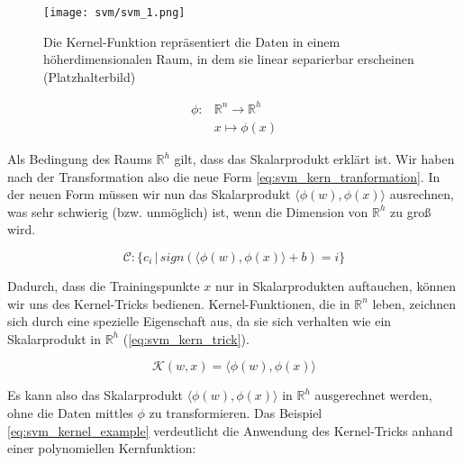 \begin{figure}[htbp] \centering
    \texttt{[image: svm/svm\_1.png]}
    \caption{Die Kernel-Funktion repräsentiert die Daten in einem höherdimensionalen Raum, in dem sie linear separierbar erscheinen (Platzhalterbild)}
    \label{fig:svm_kernel}
\end{figure}

\begin{equation}
\label{eq:svm_kernel_function}
\begin{split}
    \phi : & \mathbb{R}^n \to \mathbb{R}^h \\
    & x \mapsto \phi(x)
\end{split} 
\end{equation}

Als Bedingung des Raums $\mathbb{R}^h$ gilt, dass das Skalarprodukt erklärt ist. 
Wir haben nach der Transformation also die neue Form \ref{eq:svm_kern_tranformation}. 
In der neuen Form müssen wir nun das Skalarprodukt $\langle\phi(w),\phi(x)\rangle$ ausrechnen, was sehr schwierig (bzw. unmöglich) ist, wenn die Dimension von $\mathbb{R}^h$ zu groß wird.

\begin{equation}
\label{eq:svm_kern_tranformation}
    \mathcal{C}: \{ c_i \,|\, sign(\langle \phi(w),\phi(x) \rangle + b) = i \}
\end{equation}

Dadurch, dass die Trainingspunkte $x$ nur in Skalarprodukten auftauchen, können wir uns des Kernel-Tricks bedienen.
Kernel-Funktionen, die in $\mathbb{R}^n$ leben, zeichnen sich durch eine spezielle Eigenschaft aus, da sie sich verhalten wie ein Skalarprodukt in $\mathbb{R}^h$ (\ref{eq:svm_kern_trick}). 

\begin{equation}
\label{eq:svm_kern_trick}
    \mathcal{K}(w,x) = \langle\phi(w),\phi(x)\rangle
\end{equation}

Es kann also das Skalarprodukt $\langle\phi(w),\phi(x)\rangle$ in $\mathbb{R}^h$ ausgerechnet werden, ohne die Daten mittles $\phi$ zu transformieren. 
Das Beispiel \ref{eq:svm_kernel_example} verdeutlicht die Anwendung des Kernel-Tricks  anhand einer polynomiellen Kernfunktion:

